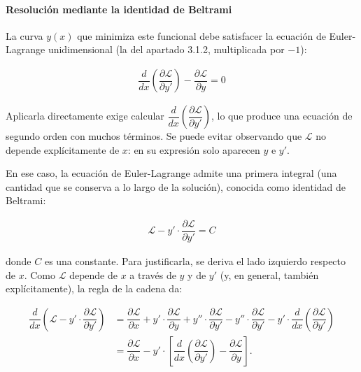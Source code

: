 \documentclass[
  spanish,
]{article}
\begin{document}
\paragraph{Resolución mediante la identidad de
Beltrami}\label{resoluciuxf3n-mediante-la-identidad-de-beltrami}

La curva \(y(x)\) que minimiza este funcional debe satisfacer la
ecuación de Euler-Lagrange unidimensional (la del apartado 3.1.2,
multiplicada por \(-1\)):

\[
\begin{aligned}
\dfrac{d}{dx}\left( \dfrac{\partial \mathcal{L}}{\partial y'} \right) - \dfrac{\partial \mathcal{L}}{\partial y} = 0
\end{aligned}
\]

Aplicarla directamente exige calcular
\(\dfrac{d}{dx}\left( \dfrac{\partial \mathcal{L}}{\partial y'} \right)\),
lo que produce una ecuación de segundo orden con muchos términos. Se
puede evitar observando que \(\mathcal{L}\) no depende explícitamente de
\(x\): en su expresión solo aparecen \(y\) e \(y'\).

En ese caso, la ecuación de Euler-Lagrange admite una primera integral
(una cantidad que se conserva a lo largo de la solución), conocida como
identidad de Beltrami:

\[
\begin{aligned}
\mathcal{L} - y' \cdot \dfrac{\partial \mathcal{L}}{\partial y'} = C
\end{aligned}
\]

donde \(C\) es una constante. Para justificarla, se deriva el lado
izquierdo respecto de \(x\). Como \(\mathcal{L}\) depende de \(x\) a
través de \(y\) y de \(y'\) (y, en general, también explícitamente), la
regla de la cadena da:

\[
\begin{aligned}
\dfrac{d}{dx}\left( \mathcal{L} - y' \cdot \dfrac{\partial \mathcal{L}}{\partial y'} \right)
&= \dfrac{\partial \mathcal{L}}{\partial x} + y' \cdot \dfrac{\partial \mathcal{L}}{\partial y} + y'' \cdot \dfrac{\partial \mathcal{L}}{\partial y'}
- y'' \cdot \dfrac{\partial \mathcal{L}}{\partial y'} - y' \cdot \dfrac{d}{dx}\left( \dfrac{\partial \mathcal{L}}{\partial y'} \right) \\
&= \dfrac{\partial \mathcal{L}}{\partial x} - y' \cdot \left[ \dfrac{d}{dx}\left( \dfrac{\partial \mathcal{L}}{\partial y'} \right) - \dfrac{\partial \mathcal{L}}{\partial y} \right].
\end{aligned}
\]
\end{document}
